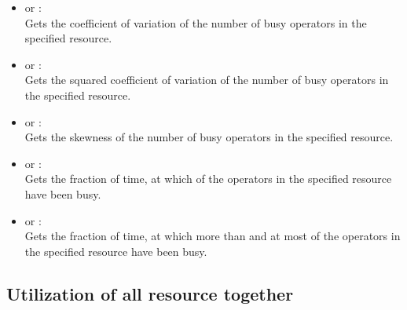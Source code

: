 \begin{itemize}
\item
{} or :\\
Gets the coefficient of variation of the number of busy operators in the specified resource.

\item
{} or :\\
Gets the squared coefficient of variation of the number of busy operators in the specified resource.

\item
{} or :\\
Gets the skewness of the number of busy operators in the specified resource.

\item
{} or :\\
Gets the fraction of time, at which  of the operators in the specified resource have been busy.

\item
{} or :\\
Gets the fraction of time, at which more than  and at most  of the operators in the specified resource have been busy.

\end{itemize}



\subsection{Utilization of all resource together}

